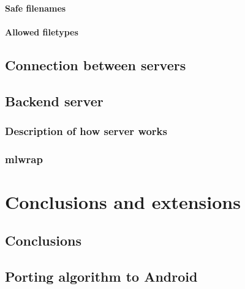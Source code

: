 \documentclass[11pt, a4paper]{report}
\begin{document}
\subsubsection{Safe filenames}

\subsubsection{Allowed filetypes}

\section{Connection between servers}

\section{Backend server}

\subsection{Description of how server works}

\subsection{mlwrap}








\chapter{Conclusions and extensions}

\section{Conclusions}

\section{Porting algorithm to Android}
\end{document}
